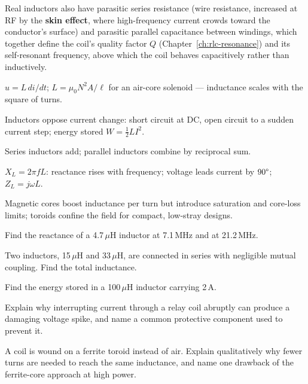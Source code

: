 Real inductors also have parasitic series resistance (wire resistance,
increased at RF by the \textbf{skin effect}, where high-frequency current
crowds toward the conductor's surface) and parasitic parallel
capacitance between windings, which together define the coil's quality
factor $Q$ (Chapter~\ref{ch:rlc-resonance}) and its self-resonant
frequency, above which the coil behaves capacitively rather than
inductively.

\begin{quickreview}
\item $u = L\,di/dt$; $L = \mu_0 N^2 A/\ell$ for an air-core solenoid ---
inductance scales with the square of turns.
\item Inductors oppose current change: short circuit at DC, open circuit
to a sudden current step; energy stored $W = \tfrac12 LI^2$.
\item Series inductors add; parallel inductors combine by reciprocal sum.
\item $X_L = 2\pi f L$: reactance rises with frequency; voltage leads
current by $90\degree$; $Z_L = j\omega L$.
\item Magnetic cores boost inductance per turn but introduce saturation
and core-loss limits; toroids confine the field for compact, low-stray
designs.
\end{quickreview}

\begin{practiceproblems}
\item Find the reactance of a 4.7\,$\mu$H inductor at 7.1\,MHz and at
21.2\,MHz.
\item Two inductors, 15\,$\mu$H and 33\,$\mu$H, are connected in series
with negligible mutual coupling. Find the total inductance.
\item Find the energy stored in a 100\,$\mu$H inductor carrying 2\,A.
\item Explain why interrupting current through a relay coil abruptly can
produce a damaging voltage spike, and name a common protective
component used to prevent it.
\item A coil is wound on a ferrite toroid instead of air. Explain
qualitatively why fewer turns are needed to reach the same inductance,
and name one drawback of the ferrite-core approach at high power.
\end{practiceproblems}
